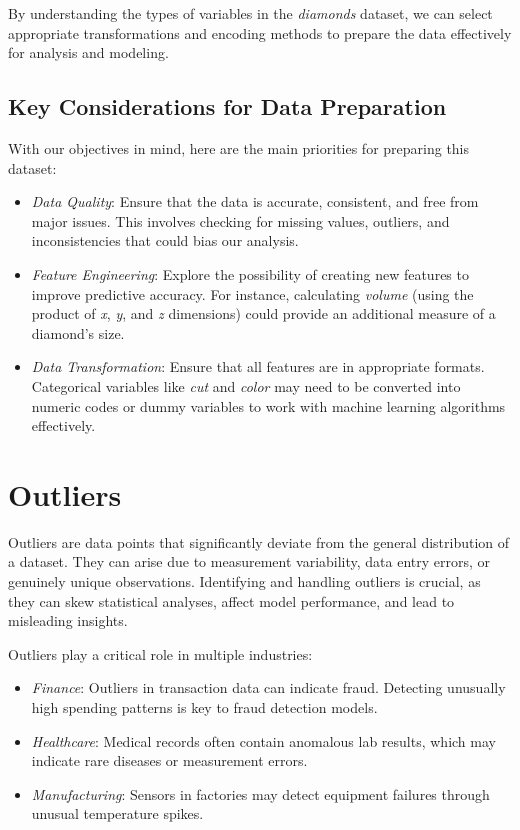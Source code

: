 \documentclass[
  11pt,
]{book}
\providecommand{\tightlist}{%
  \setlength{\itemsep}{0pt}\setlength{\parskip}{0pt}}
\theoremstyle{definition}
\theoremstyle{definition}
\theoremstyle{definition}
\theoremstyle{definition}
\theoremstyle{remark}
\begin{document}
By understanding the types of variables in the \emph{diamonds} dataset, we can select appropriate transformations and encoding methods to prepare the data effectively for analysis and modeling.

\subsection*{Key Considerations for Data Preparation}\label{key-considerations-for-data-preparation}


With our objectives in mind, here are the main priorities for preparing this dataset:

\begin{itemize}
\tightlist
\item
  \emph{Data Quality}: Ensure that the data is accurate, consistent, and free from major issues. This involves checking for missing values, outliers, and inconsistencies that could bias our analysis.
\item
  \emph{Feature Engineering}: Explore the possibility of creating new features to improve predictive accuracy. For instance, calculating \emph{volume} (using the product of \emph{x}, \emph{y}, and \emph{z} dimensions) could provide an additional measure of a diamond's size.
\item
  \emph{Data Transformation}: Ensure that all features are in appropriate formats. Categorical variables like \emph{cut} and \emph{color} may need to be converted into numeric codes or dummy variables to work with machine learning algorithms effectively.
\end{itemize}

\section{Outliers}\label{Data-pre-outliers}

Outliers are data points that significantly deviate from the general distribution of a dataset. They can arise due to measurement variability, data entry errors, or genuinely unique observations. Identifying and handling outliers is crucial, as they can skew statistical analyses, affect model performance, and lead to misleading insights.

Outliers play a critical role in multiple industries:

\begin{itemize}
\tightlist
\item
  \emph{Finance}: Outliers in transaction data can indicate fraud. Detecting unusually high spending patterns is key to fraud detection models.
\item
  \emph{Healthcare}: Medical records often contain anomalous lab results, which may indicate rare diseases or measurement errors.
\item
  \emph{Manufacturing}: Sensors in factories may detect equipment failures through unusual temperature spikes.
\end{itemize}
\end{document}
